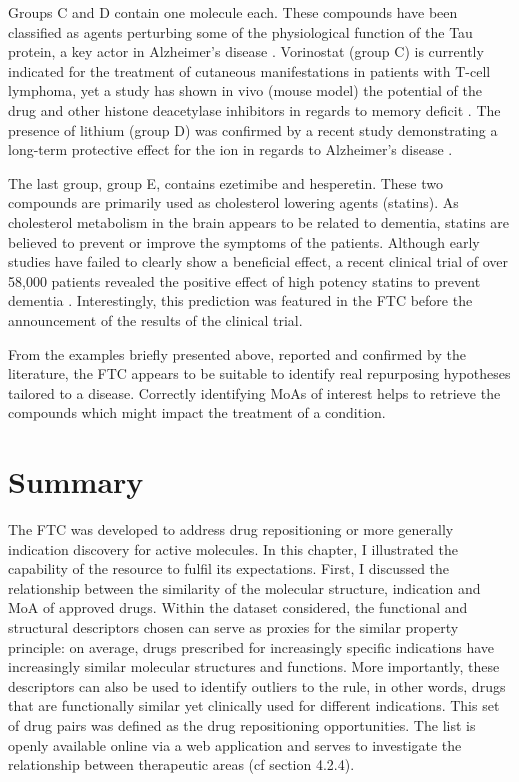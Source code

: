 Groups C and D contain one molecule each. These compounds have been classified as agents perturbing some of the physiological function of the Tau protein, a key actor in Alzheimer's disease \citep{grundke1986abnormal}. Vorinostat (group C) is currently indicated for the treatment of cutaneous manifestations in patients with T-cell lymphoma, yet a study has shown in vivo (mouse model) the potential of the drug and other histone deacetylase inhibitors in regards to memory deficit \citep{kilgore2010inhibitors}. The presence of lithium (group D) was confirmed by a recent study demonstrating a long-term protective effect for the ion in regards to Alzheimer's disease \citep{young2011more}.

The last group, group E, contains ezetimibe and hesperetin. These two compounds are primarily used as cholesterol lowering agents (statins). As cholesterol metabolism in the brain appears to be related to dementia, statins are believed to prevent or improve the symptoms of the patients. Although early studies \citep{wolozin2004cholesterol} have failed to clearly show a beneficial effect, a recent clinical trial of over 58,000 patients revealed the positive effect of high potency statins to prevent dementia \citep{esc13}. Interestingly, this prediction was featured in the FTC before the announcement of the results of the clinical trial.

From the examples briefly presented above, reported and confirmed by the literature, the FTC appears to be suitable to identify real repurposing hypotheses tailored to a disease. Correctly identifying MoAs of interest helps to retrieve the compounds which might impact the treatment of a condition.

\section{Summary}
The FTC was developed to address drug repositioning or more generally indication discovery for active molecules. In this chapter, I illustrated the capability of the resource to fulfil its expectations. First, I discussed the relationship between the similarity of the molecular structure, indication and MoA of approved drugs. Within the dataset considered, the functional and structural descriptors chosen can serve as proxies for the similar property principle: on average, drugs prescribed for increasingly specific indications have increasingly similar molecular structures and functions. More importantly, these descriptors can also be used to identify outliers to the rule, in other words, drugs that are functionally similar yet clinically used for different indications. This set of drug pairs was defined as the drug repositioning opportunities. The list is openly available online via a web application and serves to investigate the relationship between therapeutic areas (cf section 4.2.4).

